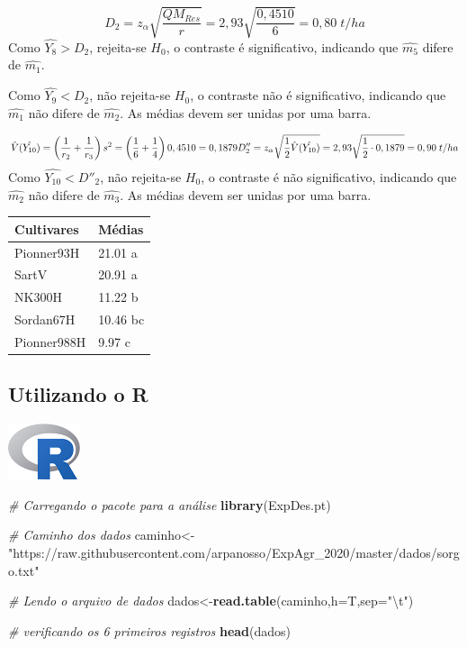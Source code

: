 \documentclass[
]{book}
\newenvironment{Shaded}{\begin{snugshade}}{\end{snugshade}}
\newcommand{\CharTok}[1]{\textcolor[rgb]{0.31,0.60,0.02}{#1}}
\newcommand{\CommentTok}[1]{\textcolor[rgb]{0.56,0.35,0.01}{\textit{#1}}}
\newcommand{\DataTypeTok}[1]{\textcolor[rgb]{0.13,0.29,0.53}{#1}}
\newcommand{\KeywordTok}[1]{\textcolor[rgb]{0.13,0.29,0.53}{\textbf{#1}}}
\newcommand{\NormalTok}[1]{#1}
\newcommand{\StringTok}[1]{\textcolor[rgb]{0.31,0.60,0.02}{#1}}
\begin{document}
\[
D_2 = z_\alpha \sqrt{\frac{QM_{Res}}{r}} = 2,93 \sqrt{\frac{0,4510}{6}} = 0,80\; t/ha
\]
Como \(\hat{Y_8} > D_2\), rejeita-se \(H_0\), o contraste é significativo, indicando que \(\hat{m_5}\) difere de \(\hat{m_1}\).

Como \(\hat{Y_9} < D_2\), não rejeita-se \(H_0\), o contraste não é significativo, indicando que \(\hat{m_1}\) não difere de \(\hat{m_2}\). As médias devem ser unidas por uma barra.

\[
\hat{V}(\hat{Y_{10}})= \left( \frac{1}{r_2} + \frac{1}{r_3}\right)s^2 = \left( \frac{1}{6} + \frac{1}{4}\right)0,4510 = 0,1879\\
D''_2 = z_\alpha \sqrt{\frac{1}{2}\hat{V}(\hat{Y_{10}})}= 2,93\sqrt{\frac{1}{2}\cdot0,1879} = 0,90\; t/ha \\
\]
Como \(\hat{Y_{10}} < D''_2\), não rejeita-se \(H_0\), o contraste é não significativo, indicando que \(\hat{m_2}\) não difere de \(\hat{m_3}\). As médias devem ser unidas por uma barra.

\begin{table}[H]
\centering
\begin{tabular}{l|l}
\hline
Cultivares & Médias\\
\hline
Pionner93H & 21.01 a\\
\hline
SartV & 20.91 a\\
\hline
NK300H & 11.22 b\\
\hline
Sordan67H & 10.46 bc\\
\hline
Pionner988H & 9.97 c\\
\hline
\end{tabular}
\end{table}

\hypertarget{utilizando-o-r}{%
\subsection{Utilizando o R}\label{utilizando-o-r}}

\includegraphics{Rlogo.png}

\begin{Shaded}
\begin{Highlighting}[]
\CommentTok{# Carregando o pacote para a análise}
\KeywordTok{library}\NormalTok{(ExpDes.pt)}

\CommentTok{# Caminho dos dados}
\NormalTok{caminho<-}\StringTok{"https://raw.githubusercontent.com/arpanosso/ExpAgr_2020/master/dados/sorgo.txt"}

\CommentTok{# Lendo o arquivo de dados}
\NormalTok{dados<-}\KeywordTok{read.table}\NormalTok{(caminho,}\DataTypeTok{h=}\NormalTok{T,}\DataTypeTok{sep=}\StringTok{"}\CharTok{\textbackslash{}t}\StringTok{"}\NormalTok{)}

\CommentTok{# verificando os 6 primeiros registros}
\KeywordTok{head}\NormalTok{(dados)}
\end{Highlighting}
\end{Shaded}
\end{document}
